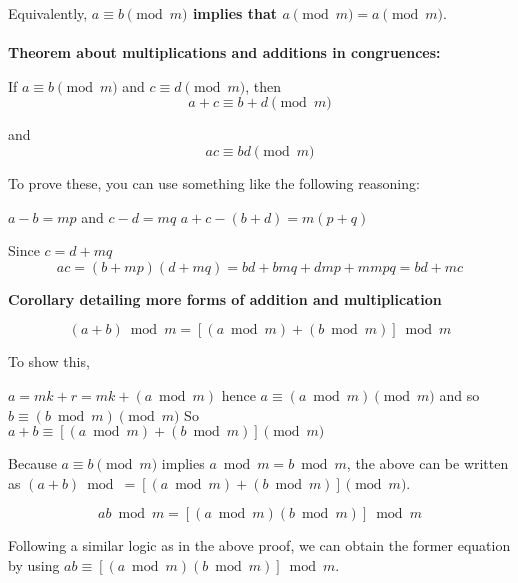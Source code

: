 Equivalently, \textbf{$a \equiv b \pmod m$ implies that $a \pmod m = a \pmod m$}.
\\~\\

\textbf{Theorem about multiplications and additions in congruences:}

If $a \equiv b \pmod m$ and $c \equiv d \pmod m$, then
\begin{equation}
    a + c \equiv b + d \pmod m
\end{equation}

and
\begin{equation}
    ac \equiv bd \pmod m
\end{equation}

To prove these, you can use something like the following reasoning:

$a - b = mp$ and $c - d = mq$
$a + c - (b + d) = m(p+q)$

Since $c = d + mq$
$$
ac = (b + mp)(d + mq) = bd + bmq + dmp + mmpq = bd + mc
$$

\textbf{Corollary detailing more forms of addition and multiplication}

\begin{equation}
    (a+b) \bmod m = [(a \bmod m) + (b \bmod m)] \bmod m
\end{equation}

To show this,

$a = mk + r = mk + (a \bmod m)$ hence
$a \equiv (a \bmod m) \pmod m$ and so $b \equiv (b \bmod m) \pmod m$
So $a + b \equiv [(a \bmod m) + (b \bmod m)] \pmod m$

Because $a \equiv b \pmod m$ implies $a \bmod m = b \bmod m$, the above can be written as
$(a+b) \bmod = [(a \bmod m) + (b \bmod m)] \pmod m$.

\begin{equation}
    ab \bmod m = [(a \bmod m)(b \bmod m)] \bmod m
\end{equation}

Following a similar logic as in the above proof, we can obtain the former equation by using $ab \equiv [(a \bmod m)(b \bmod m)] \bmod m$.
